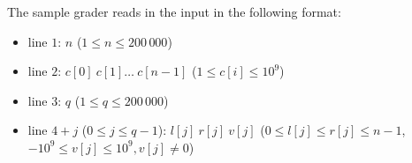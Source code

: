 The sample grader reads in the input in the following format:
\begin{itemize}
\item line $1$: $n$ ($1 \leq n \leq 200\,000$)
\item line $2$: $c[0]\ c[1]\ldots \ c[n-1]$ ($1 \leq c[i] \leq 10^9$)
\item line $3$: $q$ ($1 \leq q \leq 200\,000$)
\item line $4+j$ ($0\leq j \leq q-1$): $l[j]\ r[j]\ v[j]$ ($0 \leq l[j] \leq r[j] \leq n-1$, $-10^9\leq v[j] \leq 10^9, v[j] \neq 0$)
\end{itemize}